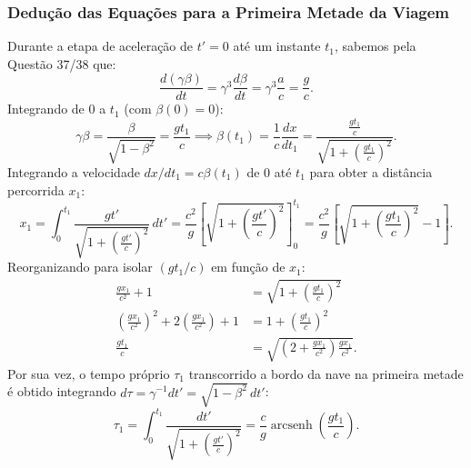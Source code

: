 \documentclass[11pt, a4paper]{article}
\begin{document}
\subsubsection{Dedução das Equações para a Primeira Metade da Viagem}
Durante a etapa de aceleração de $t' = 0$ até um instante $t_1$, sabemos pela Questão 37/38 que:
\begin{equation}
\frac{d(\gamma \beta)}{dt} = \gamma^3 \frac{d\beta}{dt} = \gamma^3 \frac{a}{c} = \frac{g}{c}.
\end{equation}
Integrando de $0$ a $t_1$ (com $\beta(0) = 0$):
\begin{equation}
\gamma \beta = \frac{\beta}{\sqrt{1 - \beta^2}} = \frac{g t_1}{c} \implies \beta(t_1) = \frac{1}{c} \frac{dx}{dt_1} = \frac{\frac{g t_1}{c}}{\sqrt{1 + \left(\frac{g t_1}{c}\right)^2}}. \label{eq:beta_t1}
\end{equation}
Integrando a velocidade $dx/dt_1 = c \beta(t_1)$ de $0$ até $t_1$ para obter a distância percorrida $x_1$:
\begin{equation}
x_1 = \int_{0}^{t_1} \frac{g t'}{\sqrt{1 + \left(\frac{g t'}{c}\right)^2}} \, dt' = \frac{c^2}{g} \left[ \sqrt{1 + \left(\frac{g t'}{c}\right)^2} \right]_{0}^{t_1} = \frac{c^2}{g} \left[ \sqrt{1 + \left(\frac{g t_1}{c}\right)^2} - 1 \right].
\end{equation}
Reorganizando para isolar $(g t_1 / c)$ em função de $x_1$:
\begin{align}
\frac{g x_1}{c^2} + 1 &= \sqrt{1 + \left(\frac{g t_1}{c}\right)^2} \nonumber \\
\left(\frac{g x_1}{c^2}\right)^2 + 2 \left(\frac{g x_1}{c^2}\right) + 1 &= 1 + \left(\frac{g t_1}{c}\right)^2 \nonumber \\
\frac{g t_1}{c} &= \sqrt{\left( 2 + \frac{g x_1}{c^2} \right) \frac{g x_1}{c^2}}. \label{eq:t1_x1}
\end{align}
Por sua vez, o tempo próprio $\tau_1$ transcorrido a bordo da nave na primeira metade é obtido integrando $d\tau = \gamma^{-1} dt' = \sqrt{1 - \beta^2} \, dt'$:
\begin{equation}
\tau_1 = \int_{0}^{t_1} \frac{dt'}{\sqrt{1 + \left(\frac{g t'}{c}\right)^2}} = \frac{c}{g} \operatorname{arcsenh}\left(\frac{g t_1}{c}\right). \label{eq:tau1_t1}
\end{equation}
\end{document}
